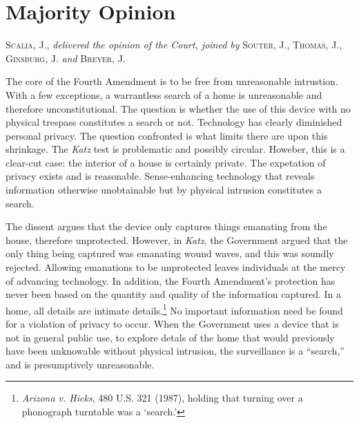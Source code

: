 \documentclass[paper=letter,fontsize=10pt]{article}
\newcommand{\pet}[1]{{\color{navy}{#1}}}
\newcommand{\note}[1]{{\marginpar{\ttfamily \footnotesize{#1}}}}
\begin{document}
\section{Majority Opinion}
	\textsc{Scalia, J.}, \textit{delivered the opinion of the Court, joined by} \textsc{Souter, J.}, \textsc{Thomas, J., Ginsburg, J.} \textit{and} \textsc{Breyer, J.} \par
		The core of the Fourth Amendment is to be free from unreasonable intrustion.
		With a few exceptions, a warrantless search of a home is unreasonable and therefore unconstitutional.
		The question is whether the use of this device with no physical trespass constitutes a search or not.
		\pet{The violation of Fourth Amendment rights has been decoupled from the trespassory violation of his property.}\note{Promotes the dismissal of \textit{Jones} test.}
		Technology has clearly diminished personal privacy. 
		The question confronted is what limits there are upon this shrinkage.
		The \textit{Katz} test is problematic and possibly circular.
		Howeber, this is a clear-cut case: the interior of a house is certainly private.
		The expetation of privacy exists and is reasonable.
		Sense-enhancing technology that reveals information otherwise unobtainable but by physical intrusion constitutes a search. \par
		The dissent argues that the device only captures things emanating from the house, therefore unprotected.
		However, in \textit{Katz}, the Government argued that the only thing being captured was emanating wound waves, and this was soundly rejected.
		Allowing emanations to be unprotected leaves individuals at the mercy of advancing technology.
		In addition, the Fourth Amendment’s protection has never been based on the quantity and quality of the information captured.
		In a home, all details are intimate details.\footnote{\textit{Arizona v. Hicks}, 480 U.S. 321 (1987), holding that turning over a phonograph turntable was a ‘search.’}
		No important information need be found for a violation of privacy to occur.
		When the Government uses a device that is not in general public use, to explore detals of the home that would previously have been unknowable without physical intrusion, the surveillance is a “search,” and is presumptively unreasonable.
\end{document}
